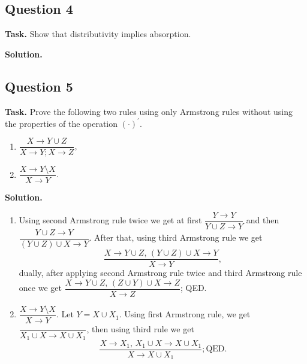 \documentclass[14pt,a4paper]{extarticle}
\begin{document}
	\newpage
	\subsection*{Question 4}
	
	\noindent\textbf{Task.}  Show that distributivity implies absorption.
	
	\noindent\textbf{Solution.} 
	
	\newpage
	\subsection*{Question 5}
	
	\noindent\textbf{Task.}  Prove the following two rules using only Armstrong rules without using the properties of the operation $(\cdot)^\prime$.
	\begin{enumerate}
		\item $\dfrac{X\rightarrow Y\cup Z}{X\rightarrow Y; X\rightarrow Z}$,
		\item $\dfrac{X \rightarrow Y\setminus X}{X \rightarrow Y}$.
	\end{enumerate}
	\noindent\textbf{Solution.} 
	\begin{enumerate}
		\item Using second Armstrong rule twice we get at first $\dfrac{Y\rightarrow Y}{Y\cup Z\rightarrow Y}$ and then $\dfrac{Y\cup Z\rightarrow Y}{(Y\cup Z) \cup X\rightarrow Y}$. After that, using third Armstrong rule we get 
		\[\dfrac{X\rightarrow Y\cup Z,\, (Y \cup Z) \cup X \rightarrow Y}{X\rightarrow Y},\]
		dually, after applying second Armstrong rule twice and third Armstrong rule once we get $\dfrac{X\rightarrow Y\cup Z,\, (Z \cup Y) \cup X \rightarrow Z}{X\rightarrow Z}$; QED.
		\item $\dfrac{X \rightarrow Y\setminus X}{X \rightarrow Y}$. Let $Y=X\cup X_1$. Using first Armstrong rule, we get $\dfrac{}{X_1\cup X\rightarrow X\cup X_1}$, then using third rule we get 
		\[\dfrac{X\rightarrow X_1,\, X_1\cup X\rightarrow X\cup X_1}{X\rightarrow X\cup X_1}; \text{QED}.\]
	\end{enumerate}
\end{document}
